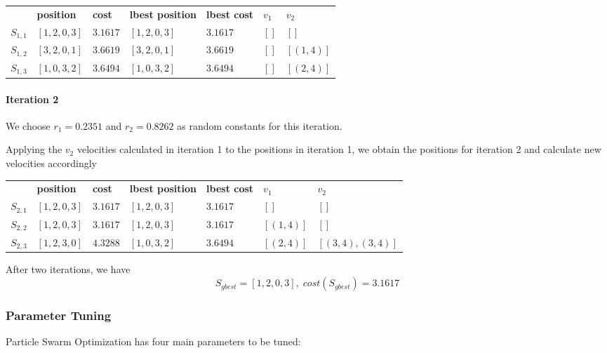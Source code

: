 \documentclass[a4paper]{article}
\newcommand{\subsubsubsection}[1]{\paragraph{#1} \mbox{}}
\begin{document}
\begin{center}
\begin{tabular}{lllllll}
          & \textbf{position} & \textbf{cost} & \textbf{lbest position} & \textbf{lbest cost} & $v_1$ & $v_2$            \\
$S_{1,1}$ & $[1, 2, 0, 3]$    & $3.1617$      & $[1, 2, 0, 3]$          & $3.1617$            & $[]$  & $[]      $ \\
$S_{1,2}$ & $[3, 2, 0, 1]$    & $3.6619$      & $[3, 2, 0, 1]$          & $3.6619$            & $[]$  & $[(1, 4)]$ \\
$S_{1,3}$ & $[1, 0, 3, 2]$    & $3.6494$      & $[1, 0, 3, 2]$          & $3.6494$            & $[]$  & $[(2, 4)]$ \\
\end{tabular}
\end{center}
\vspace{1.5em}

\subsubsubsection{Iteration 2}

We choose $r_1 = 0.2351$ and $r_2 = 0.8262$ as random constants for this
iteration.

Applying the $v_2$ velocities calculated in iteration 1 to the positions in
iteration 1, we obtain the positions for iteration 2 and calculate new
velocities accordingly
\begin{center}
\begin{tabular}{lllllll}
          & \textbf{position} & \textbf{cost} & \textbf{lbest position} & \textbf{lbest cost} & $v_1$      & $v_2$            \\
$S_{2,1}$ & $[1, 2, 0, 3]$    & $3.1617$      & $[1, 2, 0, 3]$          & $3.1617$            & $[]      $ & $[]$             \\
$S_{2,2}$ & $[1, 2, 0, 3]$    & $3.1617$      & $[1, 2, 0, 3]$          & $3.1617$            & $[(1, 4)]$ & $[]$             \\
$S_{2,3}$ & $[1, 2, 3, 0]$    & $4.3288$      & $[1, 0, 3, 2]$          & $3.6494$            & $[(2, 4)]$ & $[(3,4), (3,4)]$ \\
\end{tabular}
\end{center}
\vspace{1.5em}

After two iterations, we have
$$S_\mathit{gbest} = [1, 2, 0, 3], \; cost(S_\mathit{gbest}) = 3.1617$$

\subsubsection{Parameter Tuning}
Particle Swarm Optimization has four main parameters to be tuned:
\end{document}

